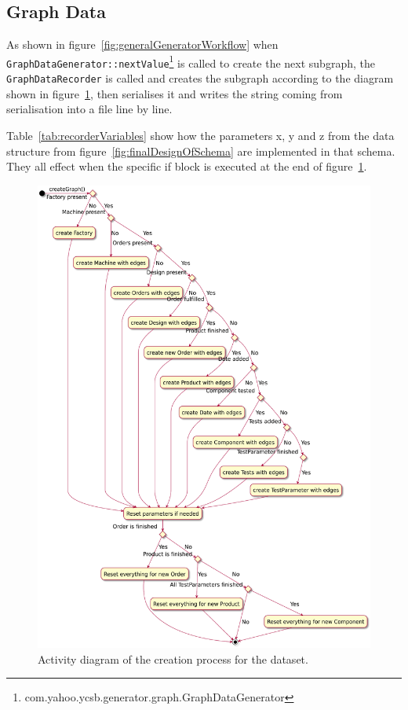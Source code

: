 \subsection{Graph Data}
\label{ch:implementation:se:graphDataRecorder}
As shown in figure~\ref{fig:generalGeneratorWorkflow} when \texttt{GraphDataGenerator::nextValue}\footnote{com.yahoo.ycsb.generator.graph.GraphDataGenerator} is called to create the next subgraph,
the \texttt{GraphDataRecorder} is called and creates the subgraph according to the diagram shown in figure~\ref{fig:graphDataRecorder},
then serialises it and writes the string coming from serialisation into a file line by line.

Table~\ref{tab:recorderVariables} show how the parameters x, y and z from the data structure from figure~\ref{fig:finalDesignOfSchema} are implemented in that schema.
They all effect when the specific if block is executed at the end of figure~\ref{fig:graphDataRecorder}.

\begin{figure}[h!]
  \centering
  \includegraphics[width=\textwidth]{images/extensions/GraphDataRecorder}
  \caption{Activity diagram of the creation process for the dataset.}
  \label{fig:graphDataRecorder}
\end{figure}

